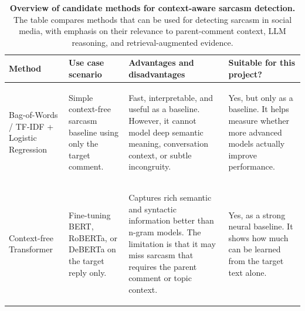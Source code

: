 \documentclass[%
 reprint,
 amsmath,amssymb,
 aps,
]{revtex4-2}
\begin{document}
\begin{table}
    \caption{{\bf Overview of candidate methods for context-aware sarcasm detection.} The table compares methods that can be used for detecting sarcasm in social media, with emphasis on their relevance to parent-comment context, LLM reasoning, and retrieval-augmented evidence.}
    \label{tab:methodsoverview}
    \begin{tabular}{| l | l | l | l |}
    \hline
       \parbox[t]{2.2cm}{\bf Method} &
       \parbox[t]{3.2cm}{\bf Use case scenario} &
       \parbox[t]{5.7cm}{\bf Advantages and disadvantages} &
       \parbox[t]{5.7cm}{\bf Suitable for this project?} \\
    \hline
        \parbox{2.2cm}{\begin{flushleft}Bag-of-Words / TF-IDF + Logistic Regression\end{flushleft}} &
        \parbox{3.2cm}{\begin{flushleft}Simple context-free sarcasm baseline using only the target comment.\end{flushleft}} &
        \parbox{5.7cm}{\begin{flushleft}Fast, interpretable, and useful as a baseline. However, it cannot model deep semantic meaning, conversation context, or subtle incongruity.\end{flushleft}} &
        \parbox{5.7cm}{\begin{flushleft}Yes, but only as a baseline. It helps measure whether more advanced models actually improve performance.\end{flushleft}} \\
    \hline
        \parbox{2.2cm}{\begin{flushleft}Context-free Transformer\end{flushleft}} &
        \parbox{3.2cm}{\begin{flushleft}Fine-tuning BERT, RoBERTa, or DeBERTa on the target reply only.\end{flushleft}} &
        \parbox{5.7cm}{\begin{flushleft}Captures rich semantic and syntactic information better than n-gram models. The limitation is that it may miss sarcasm that requires the parent comment or topic context.\end{flushleft}} &
        \parbox{5.7cm}{\begin{flushleft}Yes, as a strong neural baseline. It shows how much can be learned from the target text alone.\end{flushleft}} \\

\end{tabular}
\end{table}
\end{document}
